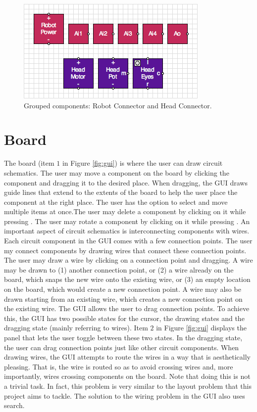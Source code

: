 \begin{figure}
\begin{center}
\includegraphics[scale=0.75]{Images/robot_head_parts.png}
\caption{Grouped components: Robot Connector and Head Connector.}
\label{fig:robot_head_parts}
\end{center}
\end{figure}

\section{Board}

The board (item $1$ in Figure \ref{fig:gui}) is where the user can draw circuit
schematics. The user may move a component on the board by clicking the component
and dragging it to the desired place. When dragging, the GUI draws guide lines
that extend to the extents of the board to help the user place the component
at the right place. The user has the option to select and move multiple items at
once.The user may delete a component by clicking on it while
pressing . The user may rotate a component by clicking on it
while pressing . An important aspect of circuit schematics is
interconnecting components with wires. Each circuit component in the GUI comes
with a few connection points. The user my connect components by drawing wires
that connect these connection points. The user may draw a wire by clicking on a
connection point and dragging. A wire may be drawn to (1) another connection
point, or (2) a wire already on the board, which snaps the new wire onto the
existing wire, or (3) an empty location on the board, which would create a new
connection point. A wire may also be drawn starting from an existing wire,
which creates a new connection point on the existing wire. The GUI allows the
user to drag connection points. To achieve this, the GUI has two possible
states for the cursor, the drawing states and the dragging state (mainly
referring to wires). Item $2$ in Figure \ref{fig:gui} displays the panel that
lets the user toggle between these two states. In the dragging state, the user
can drag connection points just like other circuit components.
When drawing wires,
the GUI attempts to route the wires in a way that is aesthetically pleasing.
That is, the wire is routed so as to avoid crossing wires and, more importantly,
wires crossing components on the board. Note that doing this is not a trivial
task. In fact, this problem is very similar to the layout problem that this
project aims to tackle. The solution to the wiring problem in the GUI also uses
search.

